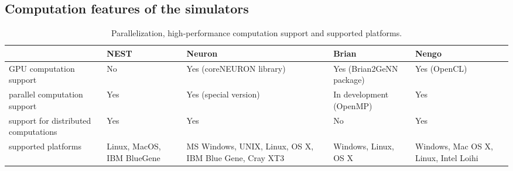 \begin{landscape}
    \chapter{Computation features of the simulators}
    \begin{table}[htbp]
        \centering
        \begin{tabularx}{\linewidth}{|>{\raggedright\arraybackslash}X|>{\raggedright\arraybackslash}X|>{\raggedright\arraybackslash}X|>{\raggedright\arraybackslash}X|>{\raggedright\arraybackslash}X|}
            \hline
                 & NEST & Neuron & Brian & Nengo \\
            \hline
            GPU computation support & No & Yes (coreNEURON library) & Yes (Brian2\-GeNN package) & Yes (OpenCL) \\
            \hline
            parallel computation support & Yes & Yes (special version) & In development (OpenMP) & Yes \\
            \hline
            support for distributed computations & Yes & Yes & No & Yes \\
            \hline
             supported platforms & Linux, MacOS, IBM BlueGene & MS Windows, UNIX, Linux, OS X, IBM Blue Gene, Cray XT3 & Windows, Linux, OS X & Windows, Mac OS X, Linux, Intel Loihi \\
             \hline
        \end{tabularx}
        \caption{Parallelization, high-performance computation support and supported platforms. }
        \label{tab:efficiency}
    \end{table}
\end{landscape}